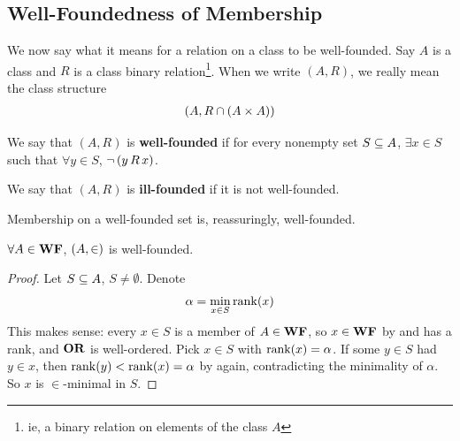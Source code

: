 \subsection{Well-Foundedness of Membership}

We now say what it means for a relation on a class to be well-founded. Say $A$ is a class and $R$ is a class binary relation\footnote{ie, a binary relation on elements of the class $A$}. When we write $(A, R)$, we really mean the class structure
\begin{align*}
    \left( A, R \cap \left( A \times A \right) \right)
\end{align*}

\begin{boxdefinition}
    We say that $(A, R)$ is \textbf{well-founded} if for every nonempty set $S \subseteq A$, $\exists x \in S$ such that $\forall y \in S$, $\neg \left( y \, R \, x \right)$.

    We say that $(A, R)$ is \textbf{ill-founded} if it is not well-founded.
\end{boxdefinition}

Membership on a well-founded set is, reassuringly, well-founded.

\begin{boxproposition}\label{Ch1:Prop:WF_Well_Founded}
    $\forall A \in \mathbf{WF}$, $\left( A, \in \right)$ is well-founded.
\end{boxproposition}
\begin{proof}
    Let $S \subseteq A$, $S \ne \emptyset$. Denote
    \begin{align*}
        \alpha = \min_{x \in S} \operatorname{rank}\!\left( x \right)
    \end{align*}
    This makes sense: every $x \in S$ is a member of $A \in \mathbf{WF}$, so $x \in \mathbf{WF}$ by  and has a rank, and $\mathbf{OR}$ is well-ordered. Pick $x \in S$ with $\operatorname{rank}\!\left( x \right) = \alpha$. If some $y \in S$ had $y \in x$, then $\operatorname{rank}\!\left( y \right) < \operatorname{rank}\!\left( x \right) = \alpha$ by  again, contradicting the minimality of $\alpha$. So $x$ is $\in$-minimal in $S$.
\end{proof}

